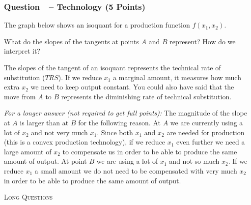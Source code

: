 \documentclass[10pt]{article}
\newcommand{\topic}[1]{\medskip\begin{center}\large\textsc{#1}\normalsize
  \end{center}}
\newcounter{question}[section]
\newcommand{\question}[1]{\refstepcounter{question}
  \subsubsection*{Question~\thequestion~-- #1}}
\begin{document}
\question{Technology (5 Points)}
The graph below shows an isoquant for a production function $f\left( x_1,x_2
\right)$.
\begin{center}
\end{center}
What do the slopes of the tangents at points $A$ and $B$ represent? How do we
interpret it?

\textcolor{solution-color}{
  The slopes of the tangent of an isoquant represents the technical rate of substitution ($TRS$). If we reduce $x_1$ a marginal amount, it measures how much extra $x_2$ we need to keep output constant. You could also have said that the move from $A$ to $B$ represents the diminishing rate of technical substitution.
}

\textcolor{solution-color}{
  \emph{For a longer answer (not required to get full points):}
}
\textcolor{solution-color}{
  The magnitude of the slope at $A$ is larger than at $B$ for the following
  reason. At $A$ we are currently using a lot of $x_2$ and not very much $x_1$.
  Since both $x_1$ and $x_2$ are needed for production (this is a convex
  production technology), if we reduce $x_1$ even further we need a large
  amount of $x_2$ to compensate us in order to be able to produce the same amount
  of output. At point $B$ we are using a lot of $x_1$ and not so much $x_2$. If
  we reduce $x_1$ a small amount we do not need to be compensated with very
  much $x_2$ in order to be able to produce the same amount of output.
}

\topic{Long Questions}
\end{document}
